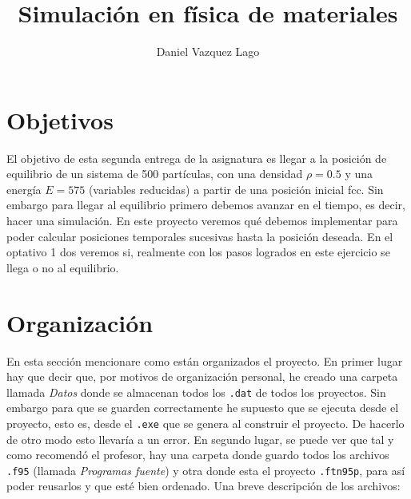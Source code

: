 \documentclass[11pt]{article} %
\author{Daniel Vazquez Lago}
\title{Simulación en física de materiales}
\begin{document}
	
	
\maketitle
\newpage
\tableofcontents
\section{Objetivos}

El objetivo de esta segunda entrega de la asignatura es llegar a la posición de equilibrio de un sistema de 500 partículas, con una densidad $\rho=0.5$ y una energía $E=575$ (variables reducidas) a partir de una posición inicial fcc. Sin embargo para llegar al equilibrio primero debemos avanzar en el tiempo, es decir, hacer una simulación. En este proyecto veremos qué debemos implementar para poder calcular posiciones temporales sucesivas hasta la posición deseada. En el optativo 1 dos veremos si, realmente con los pasos logrados en este ejercicio se llega o no al equilibrio.

\section{Organización} \label{Sec:02}

En esta sección mencionare como están organizados el proyecto. En primer lugar hay que decir que, por motivos de organización personal, he creado una carpeta llamada \textit{Datos} donde se almacenan todos los \texttt{.dat} de todos los proyectos. Sin embargo para que se guarden correctamente he supuesto que se ejecuta desde el proyecto, esto es, desde el \texttt{.exe} que se genera al construir el proyecto. De hacerlo de otro modo esto llevaría a un error. En segundo lugar, se puede ver que tal y como recomendó el profesor, hay una carpeta donde guardo todos los archivos \texttt{.f95} (llamada \textit{Programas fuente}) y otra donde esta el proyecto \texttt{.ftn95p}, para así poder reusarlos y que esté bien ordenado. Una breve descripción de los archivos:
\end{document}
